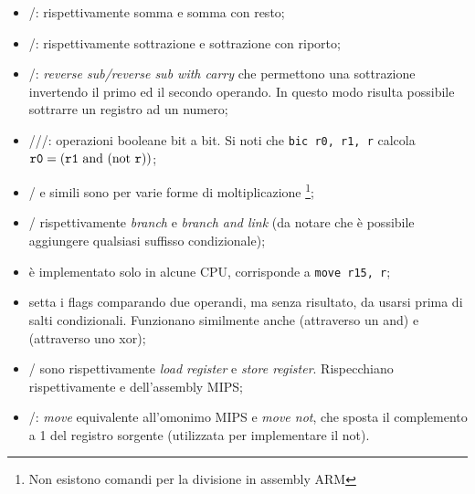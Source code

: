 \documentclass[class=book, crop=false, oneside]{standalone}
\begin{document}
\begin{itemize}
	\item {}/: rispettivamente somma e somma con resto;
	\item {}/: rispettivamente sottrazione e sottrazione con riporto;
	\item {}/: \emph{reverse sub/reverse sub with carry} che permettono una sottrazione invertendo il primo ed il secondo operando. In questo modo risulta possibile sottrarre un registro ad un numero;
	\item {}///: operazioni booleane bit a bit. Si noti che \texttt{bic r0, r1, r} calcola \(\texttt{r0} = (\texttt{r1} \textrm{ and } (\textrm{not } \texttt{r}))\);
	\item {}/ e simili sono per varie forme di moltiplicazione \footnote{Non esistono comandi per la divisione in assembly ARM};
	\item {}/ rispettivamente \emph{branch} e \emph{branch and link} (da notare che è possibile aggiungere qualsiasi suffisso condizionale);
	\item {} è implementato solo in alcune CPU, corrisponde a \texttt{move r15, r};
	\item {} setta i flags comparando due operandi, ma senza risultato, da usarsi prima di salti condizionali. Funzionano similmente anche  (attraverso un and) e  (attraverso uno xor);
	\item {}/ sono rispettivamente \emph{load register} e \emph{store register}. Rispecchiano rispettivamente  e  dell'assembly MIPS;
	\item {}/: \emph{move} equivalente all'omonimo MIPS e \emph{move not}, che sposta il complemento a 1 del registro sorgente (utilizzata per implementare il not).
\end{itemize}
\end{document}
